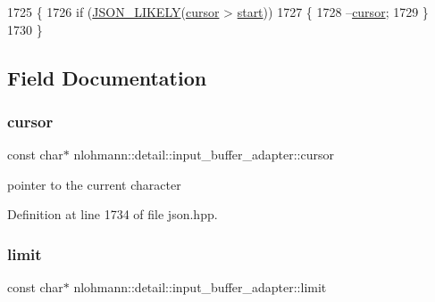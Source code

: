 \begin{DoxyCode}
1725     \{
1726         \textcolor{keywordflow}{if} (\hyperlink{json_8hpp_a41ecd1c4cf7c3d56477b9b685b5daa72}{JSON\_LIKELY}(\hyperlink{classnlohmann_1_1detail_1_1input__buffer__adapter_a49e6c8b6555af489a45ef51737eafa1c}{cursor} > \hyperlink{classnlohmann_1_1detail_1_1input__buffer__adapter_a028e9bb232143d8a2b6b204fa28c3493}{start}))
1727         \{
1728             --\hyperlink{classnlohmann_1_1detail_1_1input__buffer__adapter_a49e6c8b6555af489a45ef51737eafa1c}{cursor};
1729         \}
1730     \}
\end{DoxyCode}


\subsection{Field Documentation}
\mbox{\label{classnlohmann_1_1detail_1_1input__buffer__adapter_a49e6c8b6555af489a45ef51737eafa1c}} 
\subsubsection{\texorpdfstring{cursor}{cursor}}
{\footnotesize\ttfamily const char$\ast$ nlohmann\+::detail\+::input\+\_\+buffer\+\_\+adapter\+::cursor\hspace{0.3cm}{\ttfamily [private]}}



pointer to the current character 



Definition at line 1734 of file json.\+hpp.

\mbox{\label{classnlohmann_1_1detail_1_1input__buffer__adapter_a14e1f701754e9cc819af0fc883e6e139}} 
\subsubsection{\texorpdfstring{limit}{limit}}
{\footnotesize\ttfamily const char$\ast$ nlohmann\+::detail\+::input\+\_\+buffer\+\_\+adapter\+::limit\hspace{0.3cm}{\ttfamily [private]}}



